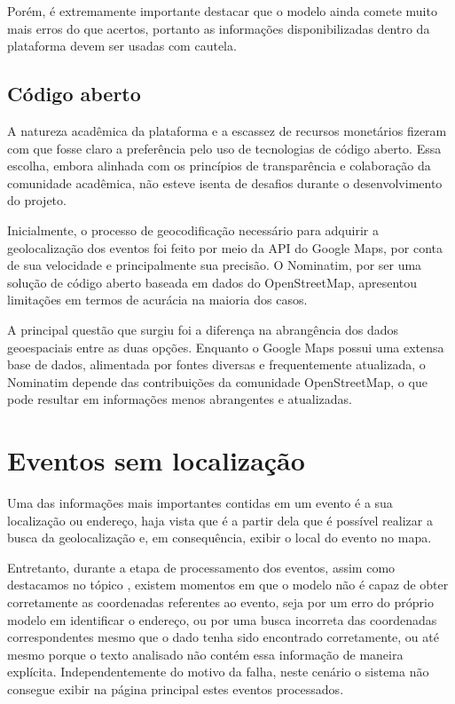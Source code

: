 Porém, é extremamente importante destacar que o modelo ainda comete muito mais
erros do que acertos, portanto as informações disponibilizadas dentro da
plataforma devem ser usadas com cautela.

\subsection{Código aberto}

A natureza acadêmica da plataforma e a escassez de recursos monetários fizeram
com que fosse claro a preferência pelo uso de tecnologias de código aberto.
Essa escolha, embora alinhada com os princípios de transparência e colaboração
da comunidade acadêmica, não esteve isenta de desafios durante o
desenvolvimento do projeto.

Inicialmente, o processo de geocodificação necessário para adquirir a
geolocalização dos eventos foi feito por meio da \acs{API} do Google Maps, por
conta de sua velocidade e principalmente sua precisão. O Nominatim, por ser uma
solução de código aberto baseada em dados do OpenStreetMap, apresentou
limitações em termos de acurácia na maioria dos casos.

A principal questão que surgiu foi a diferença na abrangência dos dados
geoespaciais entre as duas opções. Enquanto o Google Maps possui uma extensa
base de dados, alimentada por fontes diversas e frequentemente atualizada, o
Nominatim depende das contribuições da comunidade OpenStreetMap, o que pode
resultar em informações menos abrangentes e atualizadas.

\section{Eventos sem localização}

Uma das informações mais importantes contidas em um evento é a sua localização
ou endereço, haja vista que é a partir dela que é possível realizar a busca da
geolocalização e, em consequência, exibir o local do evento no mapa.

Entretanto, durante a etapa de processamento dos eventos, assim como destacamos
no tópico , existem momentos em que o modelo não é
capaz de obter corretamente as coordenadas referentes ao evento, seja por um
erro do próprio modelo em identificar o endereço, ou por uma busca incorreta
das coordenadas correspondentes mesmo que o dado tenha sido encontrado
corretamente, ou até mesmo porque o texto analisado não contém essa informação
de maneira explícita. Independentemente do motivo da falha, neste cenário o
sistema não consegue exibir na página principal estes eventos processados.

